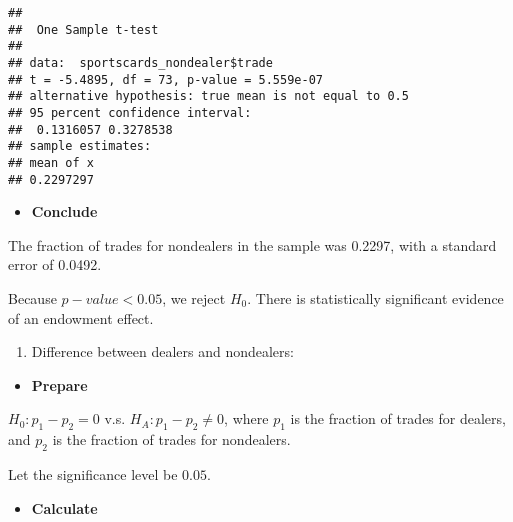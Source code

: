 \documentclass[
]{book}
\newenvironment{Shaded}{\begin{snugshade}}{\end{snugshade}}
\newcommand{\CommentTok}[1]{\textcolor[rgb]{0.56,0.35,0.01}{\textit{#1}}}
\newcommand{\KeywordTok}[1]{\textcolor[rgb]{0.13,0.29,0.53}{\textbf{#1}}}
\newcommand{\NormalTok}[1]{#1}
\newcommand{\OperatorTok}[1]{\textcolor[rgb]{0.81,0.36,0.00}{\textbf{#1}}}
\newcommand{\StringTok}[1]{\textcolor[rgb]{0.31,0.60,0.02}{#1}}
\providecommand{\tightlist}{%
  \setlength{\itemsep}{0pt}\setlength{\parskip}{0pt}}
\begin{document}
\begin{verbatim}
## 
##  One Sample t-test
## 
## data:  sportscards_nondealer$trade
## t = -5.4895, df = 73, p-value = 5.559e-07
## alternative hypothesis: true mean is not equal to 0.5
## 95 percent confidence interval:
##  0.1316057 0.3278538
## sample estimates:
## mean of x 
## 0.2297297
\end{verbatim}

\begin{itemize}
\tightlist
\item
  \textbf{Conclude}
\end{itemize}

The fraction of trades for nondealers in the sample was 0.2297, with a standard error of 0.0492.

Because \(p-value < 0.05\), we reject \(H_0\). There is statistically significant evidence of an endowment effect.

\begin{enumerate}
\def\labelenumi{\roman{enumi}.}
\setcounter{enumi}{2}
\tightlist
\item
  Difference between dealers and nondealers:
\end{enumerate}

\begin{itemize}
\tightlist
\item
  \textbf{Prepare}
\end{itemize}

\(H_0: p_1 - p_2 = 0\) v.s. \(H_A: p_1 - p_2 \neq 0\), where \(p_1\) is the fraction of trades for dealers, and \(p_2\) is the fraction of trades for nondealers.

Let the significance level be \(0.05\).

\begin{itemize}
\tightlist
\item
  \textbf{Calculate}
\end{itemize}

\begin{Shaded}
\end{Shaded}
\end{document}
